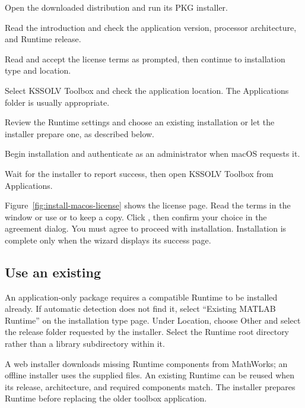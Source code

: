 \begin{steps}
\item Open the downloaded distribution and run its PKG installer.
\item Read the introduction and check the application version, processor architecture, and Runtime release.
\item Read and accept the license terms as prompted, then continue to installation type and location.
\item Select KSSOLV Toolbox and check the application location. The Applications folder is usually appropriate.
\item Review the Runtime settings and choose an existing installation or let the installer prepare one, as described below.
\item Begin installation and authenticate as an administrator when macOS requests it.
\item Wait for the installer to report success, then open KSSOLV Toolbox from Applications.
\end{steps}

Figure~\ref{fig:install-macos-license} shows the license page. Read the terms in the window or use  or  to keep a copy. Click , then confirm your choice in the agreement dialog. You must agree to proceed with installation. Installation is complete only when the wizard displays its success page.


\subsection{Use an existing }

An application-only package requires a compatible Runtime to be installed already. If automatic detection does not find it, select ``Existing MATLAB\regmark{} Runtime'' on the installation type page. Under Location, choose Other and select the release folder requested by the installer. Select the Runtime root directory rather than a library subdirectory within it.

A web installer downloads missing Runtime components from MathWorks; an offline installer uses the supplied files. An existing Runtime can be reused when its release, architecture, and required components match. The installer prepares Runtime before replacing the older toolbox application.

